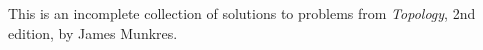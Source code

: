 This is an incomplete collection of solutions to problems from \textit{Topology}, 2nd edition, by James Munkres. 
